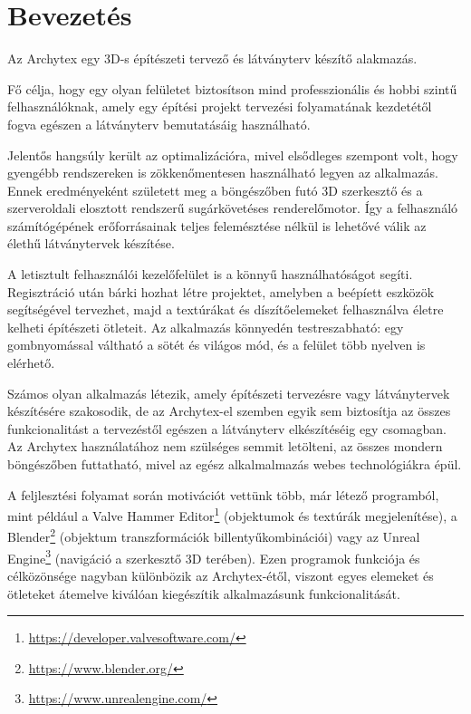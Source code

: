 \part{Bevezetés}

Az Archytex egy 3D-s építészeti tervező és látványterv készítő alakmazás.

Fő célja, hogy egy olyan felületet biztosítson mind professzionális és hobbi szintű felhasználóknak, amely egy építési projekt tervezési folyamatának kezdetétől fogva egészen a látványterv bemutatásáig használható.

Jelentős hangsúly került az optimalizációra, mivel elsődleges szempont volt, hogy gyengébb rendszereken is zökkenőmentesen használható legyen az alkalmazás. Ennek eredményeként született meg a böngészőben futó 3D szerkesztő és a szerveroldali elosztott rendszerű sugárkövetéses renderelőmotor. Így a felhasználó számítógépének erőforrásainak teljes felemésztése nélkül is lehetővé válik az élethű látványtervek készítése.

A letisztult felhasználói kezelőfelület is a könnyű használhatóságot segíti. Regisztráció után bárki hozhat létre projektet, amelyben a beépíett eszközök segítségével tervezhet, majd a textúrákat és díszítőelemeket felhasználva életre kelheti építészeti ötleteit. Az alkalmazás könnyedén testreszabható: egy gombnyomással váltható a sötét és világos mód, és a felület több nyelven is elérhető.

Számos olyan alkalmazás létezik, amely építészeti tervezésre vagy látványtervek készítésére szakosodik, de az Archytex-el szemben egyik sem biztosítja az összes funkcionalitást a tervezéstől egészen a látványterv elkészítéséig egy csomagban. Az Archytex használatához nem szülséges semmit letölteni, az összes mondern böngészőben futtatható, mivel az egész alkalmalmazás webes technológiákra épül.

A feljlesztési folyamat során motivációt vettünk több, már létező programból, mint például a Valve Hammer Editor\footnote{\url{https://developer.valvesoftware.com/}} (objektumok és textúrák megjelenítése), a Blender\footnote{\url{https://www.blender.org/}} (objektum transzformációk billentyűkombinációi) vagy az Unreal Engine\footnote{\url{https://www.unrealengine.com/}} (navigáció a szerkesztő 3D terében). Ezen programok funkciója és célközönsége nagyban különbözik az Archytex-étől, viszont egyes elemeket és ötleteket átemelve kiválóan kiegészítik alkalmazásunk funkcionalitását.